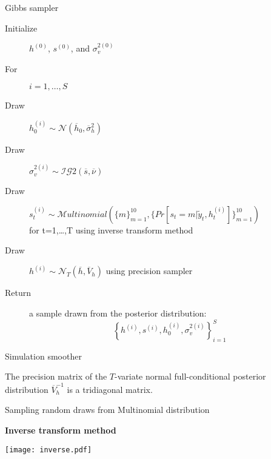 \documentclass[notes,blackandwhite,mathsans,usenames,dvipsnames]{beamer}
\begin{document}
\begin{frame}{Gibbs sampler}

\bigskip\begin{description}
\item[Initialize] $h^{(0)}$, $s^{(0)}$, and $\sigma_v^{2(0)}$

\bigskip\item[For] $i=1,\dots,S$

\bigskip\smallskip\item[Draw] $h_0^{(i)}\sim\mathcal{N}\left(\overline{h}_0,\overline{\sigma}_h^2  \right)$

\smallskip\item[Draw] $\sigma_v^{2(i)}\sim\mathcal{IG}2\left(\overline{s},\overline{\nu}  \right)$

\smallskip\item[Draw] $s_t^{(i)}\sim\mathcal{M}ultinomial\left(\{m\}_{m=1}^{10}, \{Pr[s_t=m|\tilde{y}_t, h_t^{(i)}]\}_{m=1}^{10} \right)$ \\ for t=1,\dots,T {\color{mcxs2}using inverse transform method}

\smallskip\item[Draw] $h^{(i)}\sim\mathcal{N}_T\left(\overline{h},\overline{V}_h  \right)$ {\color{mcxs2}using precision sampler}

\bigskip\item[Return] {\color{mcxs2}a sample drawn from the posterior distribution:} $$\left\{ h^{(i)}, s^{(i)}, h_0^{(i)}, \sigma_v^{2(i)} \right\}_{i=1}^{S}$$
\end{description}

\end{frame}





\begin{frame}{Simulation smoother}

{\color{mcxs2}The precision matrix of the} $T${\color{mcxs2}-variate normal full-conditional posterior distribution} $\overline{V}_h^{-1}$ {\color{mcxs2}is a tridiagonal matrix.}


\end{frame}


\begin{frame}{Sampling random draws from Multinomial distribution}

\textbf{Inverse transform method}

\centering
\texttt{[image: inverse.pdf]}
\end{frame}
\end{document}
